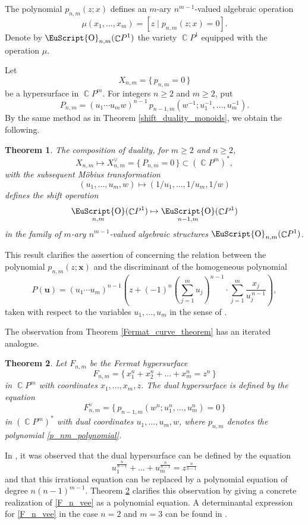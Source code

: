 \documentclass[14pt, dvipsnames]{extarticle}
\theoremstyle{plain}
\newtheorem{theorem}{Theorem}
\theoremstyle{definition}
\theoremstyle{remark}
\DeclareMathOperator{\Cc}{\mathbb{C}}
\DeclareMathOperator{\Oo}{\EuScript{O}}
\begin{document}
The polynomial $p_{n, m}(z; x)$ defines an $m$-ary $n^{m-1}$-valued algebraic operation
$$\mu(x_1, ..., x_m) = [z\mid p_{n, m}(z; x) = 0].$$
Denote by $\Oo_{n, m}(\Cc\!P^1)$ the variety $\Cc\!P^1$ equipped with the operation $\mu$.

Let
$$X_{n,m}=\{\,p_{n,m}=0\,\}$$
be a hypersurface in $\Cc\!P^m$. For integers $n\ge 2$ and $m\ge 2$, put
$$P_{n,m}=(u_1\cdots u_m w)^{n-1}\, p_{n-1, m}(w^{-1};u_1^{-1},\dots,u_m^{-1}).$$
By the same method as in Theorem \ref{shift_duality_monoids}, we obtain the following.

\begin{theorem}\label{theorem_3}
The composition of duality, for $m\ge 2$ and $n\ge 2$,
$$X_{n,m}\mapsto X_{n,m}^\vee=\{\,P_{n,m}=0\,\}\subset (\Cc\!P^m)^{\ast},$$
with the subsequent Möbius transformation
$$(u_1,\dots,u_m,w)\mapsto (1/u_1,\dots,1/u_m,1/w)$$
defines the shift operation
$$\Oo_{n,m}(\Cc\!P^1)\mapsto \Oo_{n-1,m}(\Cc\!P^1)$$
in the family of $m$-ary $n^{m-1}$-valued algebraic structures $\Oo_{n,m}(\Cc\!P^1)$.
\end{theorem}

This result clarifies the assertion of \cite[Theorem 3.2]{Gaiur} concerning the relation between the polynomial $p_{n,m}(z;\bm{x})$ and the discriminant of the homogeneous polynomial
$$P(\bm{u})=(u_1\cdots u_m)^{n-1}\left(z+(-1)^n\left(\sum_{j=1}^m u_j\right)^{n-1}\cdot \sum_{j=1}^m \frac{x_j}{u_j^{\,n-1}}\right),$$
taken with respect to the variables $u_1,\dots,u_m$ in the sense of \cite[Chapter 13]{Gelfand}.

The observation from Theorem \ref{Fermat_curve_theorem} has an iterated analogue. 

\begin{theorem}\label{F_nm_hypersurfaces}
Let $F_{n,m}$ be the Fermat hypersurface
$$F_{n,m} = \{\,x_1^n + x_2^n + ... + x_m^n = z^n\,\}$$
in $\Cc\!P^m$ with coordinates $x_1, ..., x_m, z$. The dual hypersurface is defined by the equation
\begin{equation}\label{F_n_vee}
F_{n, m}^{\vee} = \{\,p_{n-1, m}(w^n; u_1^n, ..., u_m^n) = 0\,\}
\end{equation}
in $(\Cc\!P^m)^{\ast}$ with dual coordinates $u_1, ..., u_m, w$, where $p_{n,m}$ denotes the polynomial \eqref{p_nm_polynomial}.   
\end{theorem}

In \cite[Example 4.16]{Gelfand}, it was observed that the dual hypersurface can be defined by the equation
$$u_1^{\frac{n}{n-1}} + ... + u_m^{\frac{n}{n-1}} = z^{\frac{n}{n-1}}$$
and that this irrational equation can be replaced by a polynomial equation of degree $n(n-1)^{m-1}$. Theorem \ref{F_nm_hypersurfaces} clarifies this observation by giving a concrete realization of \eqref{F_n_vee} as a polynomial equation. A determinantal expression for \eqref{F_n_vee} in the case $n = 2$ and $m = 3$ can be found in \cite[Example 9]{BK}.  
\end{document}
